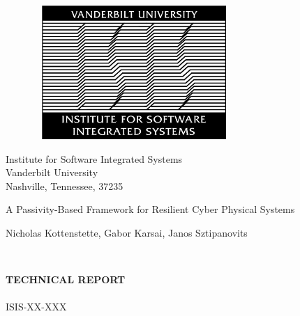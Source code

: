 \begin{figure}[!htp]
\label{fig:ISIS} \vspace{1cm}
\begin{center}
\includegraphics[width=3in,height=2in]{isis_old.eps}
\end{center}
\vspace{.0cm}
\end{figure}

\begin{center}\begin{Large}
Institute for Software Integrated Systems \\
Vanderbilt University \\
Nashville, Tennessee, 37235 \\
\end{Large}\end{center}

\vspace{1cm}

\begin{LARGE}
\begin{center}
A Passivity-Based Framework for Resilient Cyber Physical Systems \\
\vspace{.75cm}
\begin{Large}
Nicholas Kottenstette, Gabor Karsai, Janos Sztipanovits
\end{Large}\\
\end{center}
\end{LARGE}

\vspace{2cm}

\begin{Large}
\begin{center}
\textbf{TECHNICAL REPORT} \\
\ \\
ISIS-XX-XXX
\end{center}
\end{Large}

\newpage
